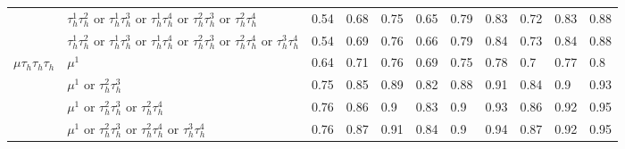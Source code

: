 \begin{table}
{\begin{tabular}{|c|c|c||lllllllll}
\multicolumn{1}{|l|}{} & \multicolumn{2}{l||}{$\tau_{h}^{1}\tau_{h}^{2}$ or $\tau_{h}^{1}\tau_{h}^{3}$ or $\tau_{h}^{1}\tau_{h}^{4}$ or $\tau_{h}^{2}\tau_{h}^{3}$ or $\tau_{h}^{2}\tau_{h}^{4}$} & \multicolumn{1}{l|}{0.54} & \multicolumn{1}{l|}{0.68} & \multicolumn{1}{l|}{0.75} & \multicolumn{1}{l|}{0.65} & \multicolumn{1}{l|}{0.79} & \multicolumn{1}{l|}{0.83} & \multicolumn{1}{l|}{0.72} & \multicolumn{1}{l|}{0.83} & \multicolumn{1}{l|}{0.88} \\
\multicolumn{1}{|l|}{} & \multicolumn{2}{l||}{$\tau_{h}^{1}\tau_{h}^{2}$ or $\tau_{h}^{1}\tau_{h}^{3}$ or $\tau_{h}^{1}\tau_{h}^{4}$ or $\tau_{h}^{2}\tau_{h}^{3}$ or $\tau_{h}^{2}\tau_{h}^{4}$ or $\tau_{h}^{3}\tau_{h}^{4}$} & \multicolumn{1}{l|}{0.54} & \multicolumn{1}{l|}{0.69} & \multicolumn{1}{l|}{0.76} & \multicolumn{1}{l|}{0.66} & \multicolumn{1}{l|}{0.79} & \multicolumn{1}{l|}{0.84} & \multicolumn{1}{l|}{0.73} & \multicolumn{1}{l|}{0.84} & \multicolumn{1}{l|}{0.88} \\
\hline
\multicolumn{1}{|l|}{$\mu\tau_{h}\tau_{h}\tau_{h}$} & \multicolumn{2}{l||}{$\mu^{1}$} & \multicolumn{1}{l|}{0.64} & \multicolumn{1}{l|}{0.71} & \multicolumn{1}{l|}{0.76} & \multicolumn{1}{l|}{0.69} & \multicolumn{1}{l|}{0.75} & \multicolumn{1}{l|}{0.78} & \multicolumn{1}{l|}{0.7} & \multicolumn{1}{l|}{0.77} & \multicolumn{1}{l|}{0.8} \\
\multicolumn{1}{|l|}{} & \multicolumn{2}{l||}{$\mu^{1}$ or $\tau_{h}^{2}\tau_{h}^{3}$} & \multicolumn{1}{l|}{0.75} & \multicolumn{1}{l|}{0.85} & \multicolumn{1}{l|}{0.89} & \multicolumn{1}{l|}{0.82} & \multicolumn{1}{l|}{0.88} & \multicolumn{1}{l|}{0.91} & \multicolumn{1}{l|}{0.84} & \multicolumn{1}{l|}{0.9} & \multicolumn{1}{l|}{0.93} \\
\multicolumn{1}{|l|}{} & \multicolumn{2}{l||}{$\mu^{1}$ or $\tau_{h}^{2}\tau_{h}^{3}$ or $\tau_{h}^{2}\tau_{h}^{4}$} & \multicolumn{1}{l|}{0.76} & \multicolumn{1}{l|}{0.86} & \multicolumn{1}{l|}{0.9} & \multicolumn{1}{l|}{0.83} & \multicolumn{1}{l|}{0.9} & \multicolumn{1}{l|}{0.93} & \multicolumn{1}{l|}{0.86} & \multicolumn{1}{l|}{0.92} & \multicolumn{1}{l|}{0.95} \\
\multicolumn{1}{|l|}{} & \multicolumn{2}{l||}{$\mu^{1}$ or $\tau_{h}^{2}\tau_{h}^{3}$ or $\tau_{h}^{2}\tau_{h}^{4}$ or $\tau_{h}^{3}\tau_{h}^{4}$} & \multicolumn{1}{l|}{0.76} & \multicolumn{1}{l|}{0.87} & \multicolumn{1}{l|}{0.91} & \multicolumn{1}{l|}{0.84} & \multicolumn{1}{l|}{0.9} & \multicolumn{1}{l|}{0.94} & \multicolumn{1}{l|}{0.87} & \multicolumn{1}{l|}{0.92} & \multicolumn{1}{l|}{0.95} \\

\end{tabular}}
\end{table}

